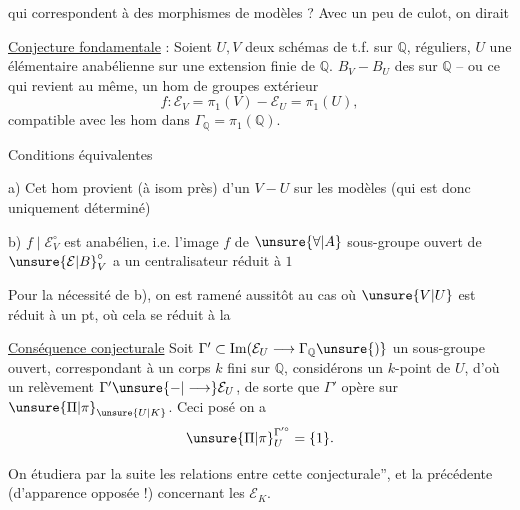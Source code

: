 qui correspondent à des morphismes de modèles ? Avec un peu de culot, on dirait

\uline{Conjecture fondamentale} : Soient $U,V$ deux schémas de t.f. sur $\mathbb{Q}$,  réguliers, $U$ une   élémentaire anabélienne sur une extension finie de $\mathbb{Q}$.     $B_V-B_U$ des   sur $\mathbb{Q}$ -- ou ce qui revient au même, un hom de groupes extérieur
\[
f:\mathcal E_V=\pi_1(V)-\mathcal E_U=\pi_1(U),
\]
compatible avec les hom dans $\Gamma_{\mathbb{Q}}=\pi_1(\mathbb{Q})$.

Conditions équivalentes

 a) Cet hom provient (à isom près) d'un  $V-U$ sur les modèles (qui est donc uniquement déterminé)

 b) $f\mid\mathcal E_V^\circ$ est anabélien, i.e. l'image  $f$ de $\unsure{\forall|A}$ sous-groupe ouvert de $\unsure{\mathcal E|B}_V^\circ$ a un centralisateur réduit à $1$

Pour la nécessité de b), on est ramené aussitôt au cas où $\unsure{V|U}$ est réduit à un pt, où cela se réduit à la 

\uline{Conséquence conjecturale} Soit $\Gamma'\subset\operatorname{Im}(\mathcal E_U\longrightarrow\Gamma_{\mathbb{Q}}\unsure{)}$ un sous-groupe ouvert, correspondant à un corps $k$ fini sur $\mathbb{Q}$, considérons un $k$-point de $U$, d'où un relèvement $\Gamma'\unsure{-|\longrightarrow}\mathcal E_U$, de sorte que $\Gamma'$ opère sur $\unsure{\Pi|\pi}_{\unsure{U|K}}$. Ceci posé\unsure{,} on a
\[
\unsure{\Pi|\pi}_U^{\Gamma'^\circ}=\{1\}.
\]

On étudiera par la suite les relations entre cette  conjecturale'', et la précédente (d'apparence opposée !) concernant les $\mathcal E_K$.

